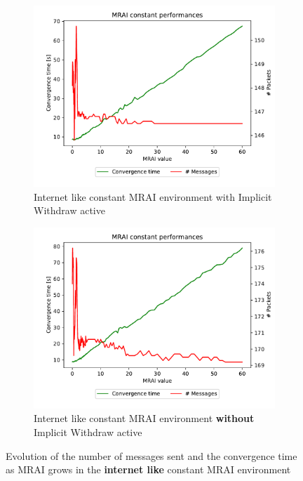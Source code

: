 \documentclass[10pt,conference,letterpaper]{IEEEtran}
\newcommand{\figwidth}{0.78}
\newcommand{\figvspace}{-1.5em}
\begin{document}
\begin{figure}[tb]
	\centering

	\begin{subfigure}{\columnwidth}
		\centering
		\includegraphics[width=\figwidth\columnwidth]{images/internet_like/graph-100-constant/mrai_evolution}
		\caption{Internet like constant \ac{MRAI} environment with Implicit Withdraw active}
		\label{fig:constant_IW_mrai_evolution}
		\qquad
	\end{subfigure}

	\begin{subfigure}{\columnwidth}
		\centering
		\includegraphics[width=\figwidth\columnwidth]{images/internet_like/graph-100-constant-noIW/mrai_evolution}
		\caption{Internet like constant \ac{MRAI} environment \textbf{without} Implicit Withdraw active}
		\label{fig:constant_noIW_mrai_evolution}
		\qquad
	\end{subfigure}

	\caption{Evolution of the number of messages sent and the convergence time as \ac{MRAI} grows
		in the \textbf{internet like} constant \ac{MRAI} environment}
	\label{fig:constant_mrai_evolution}
	\vspace{\figvspace}
\end{figure}
\end{document}
